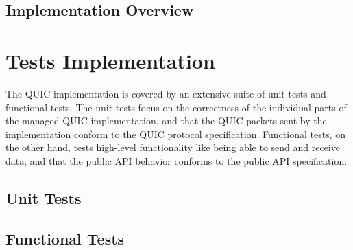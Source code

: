 
\subsection{Implementation Overview}



\section{Tests Implementation}

The QUIC implementation is covered by an extensive suite of unit tests and functional tests. The
unit tests focus on the correctness of the individual parts of the managed QUIC implementation, and
that the QUIC packets sent by the implementation conform to the QUIC protocol specification.
Functional tests, on the other hand, tests high-level functionality like being able to send and
receive data, and that the public API behavior conforms to the public API specification.

\subsection{Unit Tests}

\subsection{Functional Tests}
